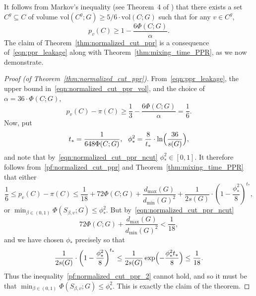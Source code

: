 \documentclass{article}
\newcommand{\vol}{\mathrm{vol}}
\newcommand{\1}{\mathbf{1}}
\theoremstyle{definition}
\theoremstyle{remark}
\begin{document}
It follows from Markov's inequality (see Theorem~4 of \cite{andersen2006}) that there exists a set $C^g \subseteq C$ of volume $\vol(C^g;G) \geq 5/6 \cdot \vol(C;G)$ such that for any $v \in C^g$,
\begin{equation}
\label{eqn:ppr_leakage}
p_v(C) \geq 1 - \frac{6\Phi(C;G)}{\alpha}.
\end{equation}
The claim of Theorem~\ref{thm:normalized_cut_ppr} is a consequence of~\eqref{eqn:ppr_leakage} along with Theorem~\ref{thm:mixing_time_PPR}, as we now demonstrate.
\begin{proof}[Proof (of Theorem~\ref{thm:normalized_cut_ppr})]
	From~\eqref{eqn:ppr_leakage}, the upper bound in~\eqref{eqn:normalized_cut_ppr_vol}, and the choice of $\alpha = 36 \cdot \Phi(C;G)$, 
	\begin{equation}
	\label{pf:normalized_cut_ppr}
	p_v(C) - \pi(C) \geq \frac{1}{3} - \frac{6 \Phi(C;G)}{\alpha} = \frac{1}{6}.
	\end{equation}
	Now, put 
	\begin{equation*}
	t_{\ast} = \frac{1}{648 \Phi(C;G)},~~\phi_{\ast}^2 = \frac{8}{t_{\ast}} \cdot \ln\Bigl(\frac{36}{s(G)}\Bigr),
	\end{equation*}
	and note that by~\eqref{eqn:normalized_cut_ppr_ncut} $\phi_{\ast}^2 \in [0,1]$. It therefore follows from~\eqref{pf:normalized_cut_ppr} and Theorem~\ref{thm:mixing_time_PPR} that either
	\begin{equation}
	\label{pf:normalized_cut_ppr_2}
	\frac{1}{6} \leq p_v(C) - \pi(C) \leq \frac{1}{18} + 72 \Phi(C;G) + \frac{d_{\max}(G)}{d_{\min}(G)^2} + \frac{1}{2s(G)} \cdot \left(1 - \frac{\phi_{\ast}^2}{8}\right)^{t_{\ast}},
	\end{equation}
	or $\min_{\beta \in (0,1)} \Phi(S_{\beta,v};G) \leq \phi_{\ast}^2$. But by~\eqref{eqn:normalized_cut_ppr_ncut}
	\begin{equation*}
	72 \Phi(C;G) + \frac{d_{\max}(G)}{d_{\min}(G)^2} < \frac{1}{18},
	\end{equation*}
	and we have chosen $\phi_{\ast}$ precisely so that
	\begin{equation*}
	\frac{1}{2s(G)} \cdot \left(1 - \frac{\phi_{\ast}^2}{8}\right)^{t_{\ast}} \leq \frac{1}{2s(G)} \exp\Bigl(-\frac{\phi_{\ast}^2 t_{\ast}}{8}\Bigr) \leq \frac{1}{18}.
	\end{equation*}
	Thus the inequality~\eqref{pf:normalized_cut_ppr_2} cannot hold, and so it must be that $\min_{\beta \in (0,1)} \Phi(S_{\beta,v};G) \leq \phi_{\ast}^2$. This is exactly the claim of the theorem.
\end{proof}
\end{document}
